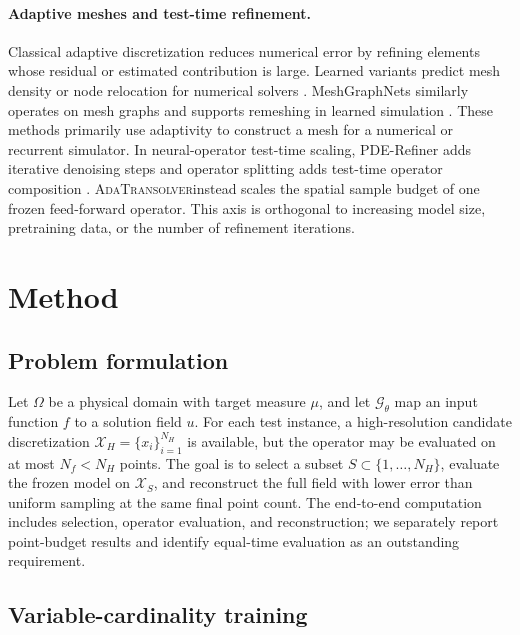 \documentclass{article}
\newcommand{\method}{\textsc{AdaTransolver}}
\begin{document}
\paragraph{Adaptive meshes and test-time refinement.}
Classical adaptive discretization reduces numerical error by refining elements
whose residual or estimated contribution is large. Learned variants predict
mesh density or node relocation for numerical solvers
\citep{huang2021meshgeneration,obiols2023adarnet,rowbottom2024gadaptivity}.
MeshGraphNets similarly operates on mesh graphs and supports remeshing in
learned simulation \citep{pfaff2021meshgraphnets}. These methods primarily use
adaptivity to construct a mesh for a numerical or recurrent simulator. In
neural-operator test-time scaling, PDE-Refiner adds iterative denoising steps and
operator splitting adds test-time operator composition
\citep{lippe2023pderefiner,serrano2026splitting}. \method instead scales the
spatial sample budget of one frozen feed-forward operator. This axis is
orthogonal to increasing model size, pretraining data, or the number of
refinement iterations.

\section{Method}

\subsection{Problem formulation}

Let $\Omega$ be a physical domain with target measure $\mu$, and let
$\mathcal{G}_\theta$ map an input function $f$ to a solution field $u$.
For each test instance, a high-resolution candidate discretization
$\mathcal{X}_H=\{x_i\}_{i=1}^{N_H}$ is available, but the operator may be
evaluated on at most $N_f<N_H$ points. The goal is to select a subset
$S\subset\{1,\ldots,N_H\}$, evaluate the frozen model on $\mathcal{X}_S$, and
reconstruct the full field with lower error than uniform sampling at the same
final point count. The end-to-end computation includes selection, operator
evaluation, and reconstruction; we separately report point-budget results and
identify equal-time evaluation as an outstanding requirement.

\subsection{Variable-cardinality training}
\end{document}
